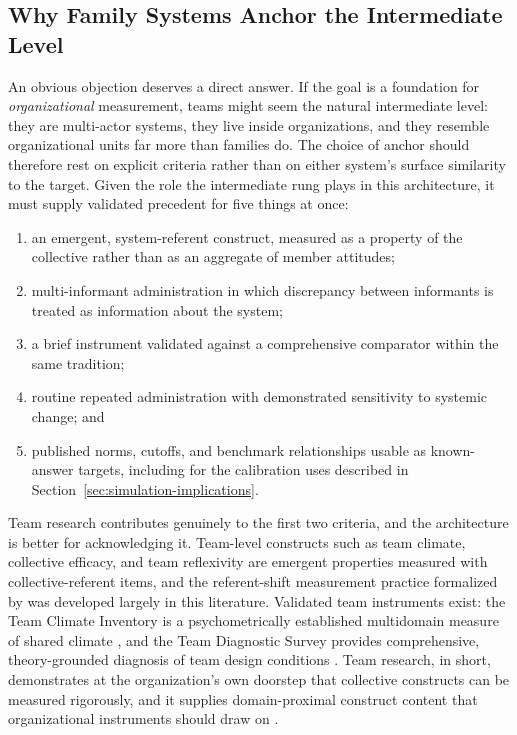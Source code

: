 \documentclass[12pt, letterpaper]{article}
\begin{document}
\subsection{Why Family Systems Anchor the Intermediate Level}
\label{sec:why-families}

An obvious objection deserves a direct answer. If the goal is a foundation for \emph{organizational} measurement, teams might seem the natural intermediate level: they are multi-actor systems, they live inside organizations, and they resemble organizational units far more than families do. The choice of anchor should therefore rest on explicit criteria rather than on either system's surface similarity to the target. Given the role the intermediate rung plays in this architecture, it must supply validated precedent for five things at once:

\begin{enumerate}[nosep]
    \item an emergent, system-referent construct, measured as a property of the collective rather than as an aggregate of member attitudes;
    \item multi-informant administration in which discrepancy between informants is treated as information about the system;
    \item a brief instrument validated against a comprehensive comparator within the same tradition;
    \item routine repeated administration with demonstrated sensitivity to systemic change; and
    \item published norms, cutoffs, and benchmark relationships usable as known-answer targets, including for the calibration uses described in Section~\ref{sec:simulation-implications}.
\end{enumerate}

Team research contributes genuinely to the first two criteria, and the architecture is better for acknowledging it. Team-level constructs such as team climate, collective efficacy, and team reflexivity are emergent properties measured with collective-referent items, and the referent-shift measurement practice formalized by \textcite{chan1998} was developed largely in this literature. Validated team instruments exist: the Team Climate Inventory is a psychometrically established multidomain measure of shared climate \parencite{andersonwest1998}, and the Team Diagnostic Survey provides comprehensive, theory-grounded diagnosis of team design conditions \parencite{wageman2005}. Team research, in short, demonstrates at the organization's own doorstep that collective constructs can be measured rigorously, and it supplies domain-proximal construct content that organizational instruments should draw on \parencite{mathieu2008}.
\end{document}
